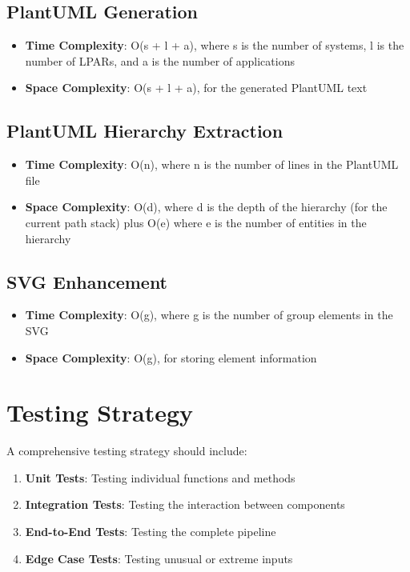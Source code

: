 \documentclass[a4paper,12pt]{article}
\begin{document}
\subsection{PlantUML Generation}

\begin{itemize}
    \item \textbf{Time Complexity}: O(s + l + a), where s is the number of systems, l is the number of LPARs, and a is the number of applications
    \item \textbf{Space Complexity}: O(s + l + a), for the generated PlantUML text
\end{itemize}

\subsection{PlantUML Hierarchy Extraction}

\begin{itemize}
    \item \textbf{Time Complexity}: O(n), where n is the number of lines in the PlantUML file
    \item \textbf{Space Complexity}: O(d), where d is the depth of the hierarchy (for the current path stack) plus O(e) where e is the number of entities in the hierarchy
\end{itemize}

\subsection{SVG Enhancement}

\begin{itemize}
    \item \textbf{Time Complexity}: O(g), where g is the number of group elements in the SVG
    \item \textbf{Space Complexity}: O(g), for storing element information
\end{itemize}

\section{Testing Strategy}

A comprehensive testing strategy should include:

\begin{enumerate}
    \item \textbf{Unit Tests}: Testing individual functions and methods
    \item \textbf{Integration Tests}: Testing the interaction between components
    \item \textbf{End-to-End Tests}: Testing the complete pipeline
    \item \textbf{Edge Case Tests}: Testing unusual or extreme inputs
\end{enumerate}
\end{document}

